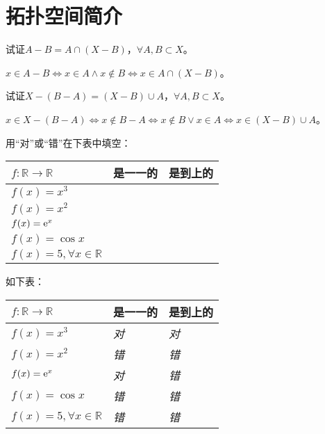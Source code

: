 
\chapter{拓扑空间简介}

\begin{xiti}
	\item 试证$\displaystyle A-B=A\cap (X-B)$，$\displaystyle \forall A,B\subset X$。
	
	\begin{zm}
			$  x\in A-B \iff x\in A \wedge x\notin B\iff x\in A\cap (X-B) $。 
	\end{zm}
	
	\item 试证$X-(B-A)=(X-B)\cup A$，$ \forall A,B\subset X$。
	
	\begin{zm}
		$ x\in X-(B-A) \iff x\notin B-A \iff x\notin B \vee x\in A \iff x\in (X-B)\cup A $。
	\end{zm}
	
	\item 用“对”或“错”在下表中填空：
	\begin{table}[htb]
		\begin{tabularx}{\textwidth}{YYY}
			\toprule
			$f\colon \mathbb{R}\rightarrow \mathbb{R} $&是一一的&是到上的\\
			\midrule
			$f(x)=x^3 $& & \\
			$f(x)=x^2$& &\\
			$f(x)=\mathrm{e}^{x}$&&\\
			$f(x)=\cos x$&&\\
			$f(x)=5,\forall x\in \mathbb{R}$&&\\
			\bottomrule
		\end{tabularx}
	\end{table}
	
	\begin{jie}
		如下表：
		\begin{table}[htb]
			\begin{tabularx}{\textwidth}{YYY}
				\toprule
				$f\colon \mathbb{R}\rightarrow \mathbb{R} $&是一一的&是到上的\\
				\midrule
				$f(x)=x^3$&\textit{对} &\textit{对}\\
				$f(x)=x^2 $&\textit{错} &\textit{错}\\
				$f(x)=\mathrm{e}^{x}$&\textit{对}&\textit{错}\\
				$f(x)=\cos x$&\textit{错}&\textit{错}\\
				$f(x)=5,\forall x\in \mathbb{R}$&\textit{错}&\textit{错}\\
				\bottomrule
			\end{tabularx}
		\end{table}
	\end{jie}
	

\end{xiti}
